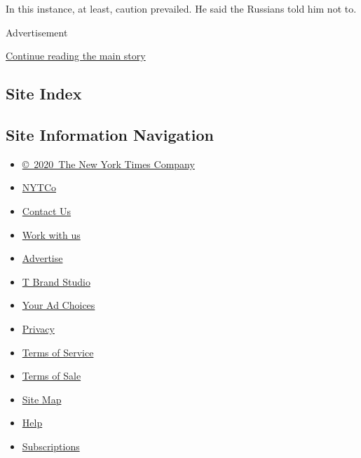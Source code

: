 In this instance, at least, caution prevailed. He said the Russians told
him not to.

Advertisement

\protect\hyperlink{after-bottom}{Continue reading the main story}

\hypertarget{site-index}{%
\subsection{Site Index}\label{site-index}}

\hypertarget{site-information-navigation}{%
\subsection{Site Information
Navigation}\label{site-information-navigation}}

\begin{itemize}
\tightlist
\item
  \href{https://help.nytimes.com/hc/en-us/articles/115014792127-Copyright-notice}{©~2020~The
  New York Times Company}
\end{itemize}

\begin{itemize}
\tightlist
\item
  \href{https://www.nytco.com/}{NYTCo}
\item
  \href{https://help.nytimes.com/hc/en-us/articles/115015385887-Contact-Us}{Contact
  Us}
\item
  \href{https://www.nytco.com/careers/}{Work with us}
\item
  \href{https://nytmediakit.com/}{Advertise}
\item
  \href{http://www.tbrandstudio.com/}{T Brand Studio}
\item
  \href{https://www.nytimes.com/privacy/cookie-policy\#how-do-i-manage-trackers}{Your
  Ad Choices}
\item
  \href{https://www.nytimes.com/privacy}{Privacy}
\item
  \href{https://help.nytimes.com/hc/en-us/articles/115014893428-Terms-of-service}{Terms
  of Service}
\item
  \href{https://help.nytimes.com/hc/en-us/articles/115014893968-Terms-of-sale}{Terms
  of Sale}
\item
  \href{https://spiderbites.nytimes.com}{Site Map}
\item
  \href{https://help.nytimes.com/hc/en-us}{Help}
\item
  \href{https://www.nytimes.com/subscription?campaignId=37WXW}{Subscriptions}
\end{itemize}
